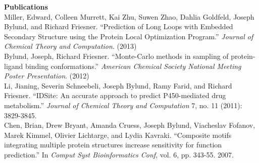%
%
%
%
%
%

\vspace{\mybigskip}
\vspace{\mybigskip}
\myfontsize{\littleheader}
\textbf{Publications}\\
\myfontsize{\bodysize}
\vspace{1ex}
Miller, Edward, Colleen Murrett, Kai Zhu, Suwen Zhao, Dahlia Goldfeld, Joseph Bylund, and Richard Friesner. ``Prediction of Long Loops with Embedded Secondary Structure using the Protein Local Optimization Program.'' \textit{Journal of Chemical Theory and Computation}. (2013)\\
\vspace{1ex}
Bylund, Joseph, Richard Friesner. ``Monte-Carlo methods in sampling of protein-ligand binding conformations.'' \textit{American Chemical Society National Meeting Poster Presentation}. (2012)\\
\vspace{1ex}
Li, Jianing, Severin Schneebeli, Joseph Bylund, Ramy Farid, and Richard Friesner. ``IDSite: An accurate approach to predict P450-mediated drug metabolism.'' \textit{Journal of Chemical Theory and Computation} 7, no. 11 (2011): 3829-3845.\\
\vspace{1ex}
Chen, Brian, Drew Bryant, Amanda Cruess, Joseph Bylund, Viacheslav Fofanov, Marek Kimmel, Olivier Lichtarge, and Lydia Kavraki. ``Composite motifs integrating multiple protein structures increase sensitivity for function prediction.'' In \textit{Comput Syst Bioinformatics Conf}, vol. 6, pp. 343-55. 2007.\\
\fi
